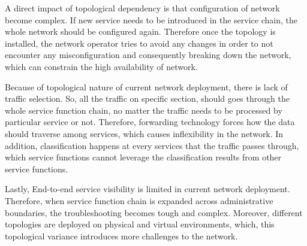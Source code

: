 A direct impact of topological dependency is that configuration of network become complex. If new service needs to be introduced in the service chain, the whole network should be configured again. Therefore once the topology is installed, the network operator tries to avoid any changes in order to not encounter any misconfiguration and consequently breaking down the network, which can constrain the high availability of network.

Because of topological nature of current network deployment, there is lack of traffic selection. So, all the traffic on specific section, should goes through the whole service function chain, no matter the traffic needs to be processed by particular service or not. Therefore, forwarding technology forces how the data should  traverse among services, which causes inflexibility in the network. In addition, classification happens at every services that the traffic passes through, which service functions cannot leverage the classification results from other service functions. 

Lastly, End-to-end service visibility is limited in current network deployment. Therefore, when service function chain is expanded across administrative boundaries, the troubleshooting becomes tough and complex. Moreover, different topologies are deployed on physical and virtual environments, which, this topological variance introduces more challenges to the network.

\clearpage
